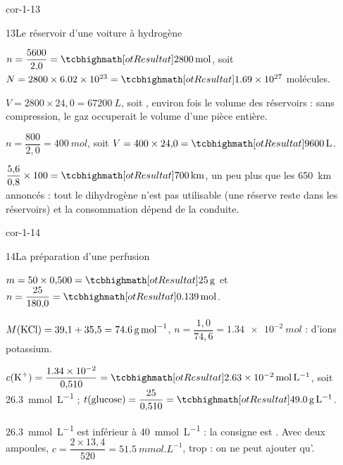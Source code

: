 \begin{blocLivre}{cor-1-13}
\begin{corrige}{13}{Le réservoir d'une voiture à hydrogène}
\begin{questions}
\item $n=\dfrac{\num{5600}}{2{,}0}=\res{\qty{2800}{mol}}$, soit $N=2800\times\num{6.02e23}=\res{\num{1.69e27}}$ molécules.
\item $V=2800\times24{,}0=\qty{67200}{L}$, soit , environ  fois le volume des réservoirs : sans compression, le gaz
occuperait le volume d'une pièce entière.
\item $n=\dfrac{800}{2{,}0}=\qty{400}{mol}$, soit $V=400\times24{,}0=\res{\qty{9600}{L}}$.
\item $\dfrac{5{,}6}{0{,}8}\times100=\res{\qty{700}{km}}$, un peu plus que les \qty{650}{km} annoncés : tout le dihydrogène n'est pas utilisable (une
réserve reste dans les réservoirs) et la consommation dépend de la conduite.
\end{questions}
\end{corrige}
\end{blocLivre}
\begin{blocLivre}{cor-1-14}
\begin{corrige}{14}{La préparation d'une perfusion}
\begin{questions}
\item $m=50\times0{,}500=\res{\qty{25}{g}}$ et $n=\dfrac{25}{180{,}0}=\res{\qty{0,139}{mol}}$.
\item $M(\ce{KCl})=39{,}1+35{,}5=\qty{74,6}{g.mol^{-1}}$, $n=\dfrac{1{,}0}{74{,}6}=\qty{1,34e-2}{mol}$ :  d'ions potassium.
\item $c(\ce{K+})=\dfrac{\num{1.34e-2}}{0{,}510}=\res{\qty{2,63e-2}{mol.L^{-1}}}$, soit \qty{26,3}{mmol.L^{-1}} ; $t(\text{glucose})=\dfrac{25}{0{,}510}=\res{\qty{49,0}{g.L^{-1}}}$.
\item \qty{26,3}{mmol.L^{-1}} est inférieur à \qty{40}{mmol.L^{-1}} : la consigne est . Avec deux ampoules,
$c=\dfrac{2\times13{,}4}{520}=\qty{51,5}{mmol.L^{-1}}$, trop : on ne peut ajouter qu'.
\end{questions}
\end{corrige}
\end{blocLivre}
